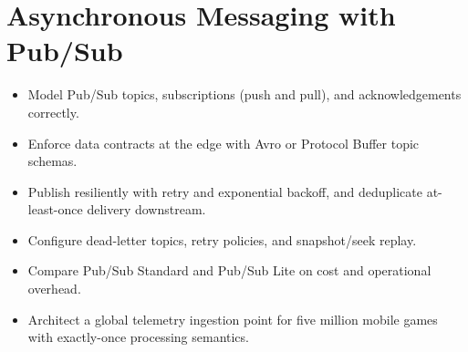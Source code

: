 \chapter{Asynchronous Messaging with Pub/Sub}

\begin{objectives}
\begin{itemize}
    \item Model Pub/Sub topics, subscriptions (push and pull), and acknowledgements correctly.
    \item Enforce data contracts at the edge with Avro or Protocol Buffer topic schemas.
    \item Publish resiliently with retry and exponential backoff, and deduplicate at-least-once delivery downstream.
    \item Configure dead-letter topics, retry policies, and snapshot/seek replay.
    \item Compare Pub/Sub Standard and Pub/Sub Lite on cost and operational overhead.
    \item Architect a global telemetry ingestion point for five million mobile games with exactly-once processing semantics.
\end{itemize}
\end{objectives}

